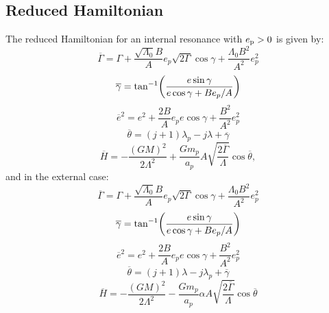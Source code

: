 \documentclass{article}
\newcommand{\extra}[1]{{}}
\newcommand{\edisk}{e_{\rm disk}}
\newcommand{\ep}{e_{\rm p}}
\DeclarePairedDelimiter{\abs}{|}{|}
\DeclarePairedDelimiter{\p}{(}{)}
\begin{document}
\subsection{Reduced Hamiltonian}\label{app:reducedH}
The reduced Hamiltonian for an internal resonance with $\ep>0$ is given by:
  \[ \overline{\Gamma} = \Gamma + \frac{\sqrt{\Lambda_0}B}{A} e_p\sqrt{2\Gamma}\cos\gamma + \frac{\Lambda_0B^2}{A^2}e_p^2 \]
\[ \overline{\gamma} = \tan^{-1}\p*{\frac{e\sin\gamma}{e\cos\gamma + Be_p/A}} \]
\[ \overline{e}^2 = e^2 + \frac{2B}{A} e_p e \cos\gamma + \frac{B^2}{A^2}e_p^2\]
  \[\overline{\theta} = (j+1)\lambda_p - j\lambda + \overline{\gamma} \]
\[ \overline{H} = - \frac{(GM)^2}{2\Lambda^2} + \frac{Gm_p}{a_p}A\sqrt{\frac{2\overline{\Gamma}}{\Lambda}}\cos\overline{\theta}, \]
and in the external case:
  \[ \overline{\Gamma} = \Gamma + \frac{\sqrt{\Lambda_0}B}{A} e_p\sqrt{2\Gamma}\cos\gamma + \frac{\Lambda_0B^2}{A^2}e_p^2 \]
\[ \overline{\gamma} = \tan^{-1}\p*{\frac{e\sin\gamma}{e\cos\gamma + Be_p/A}} \]
\[ \overline{e}^2 = e^2 + \frac{2B}{A} e_p e \cos\gamma + \frac{B^2}{A^2}e_p^2\]
  \[\overline{\theta} = (j+1)\lambda - j\lambda_p + \overline{\gamma} \]
\[ \overline{H} = - \frac{(GM)^2}{2\Lambda^2} - \frac{Gm_p}{a_p}\alpha A\sqrt{\frac{2\overline{\Gamma}}{\Lambda}}\cos\overline{\theta} \]
\extra{
For the $\edisk\lesssim \ep$ regime in the $(\ep,\edisk)$ parameter space,
$\dot{\gamma}\to 0$ and $\abs{\gamma-\gamma_p}\to 0$, resulting in
apsidal alignment. In the opposite regime, $\dot{\gamma}\neq 0$ and
$\abs{\gamma - \gamma_p}$ circulates.
For $\edisk \sim \ep$, the dynamics are complicated, and we turn to numerical
simulations.

  \begin{equation}
  \label{eq:gammadot}
\dot{\gamma} = \mu_p\left(\pm\frac{A\cos\theta}{\sqrt{2\Gamma\Lambda}}
    - \frac{2C}{\Lambda} -
    D\ep\frac{\cos\gamma}{\sqrt{2\Gamma\Lambda}}\right).
\end{equation}
Since $\theta$ circulates, the first term typically averages out to zero,
and the $(\pm)$ does not matter. If $\dot{\gamma}\approx 0$,
then
\[ \ep \approx 2\abs*{\frac{C}{D}}\edisk\approx \edisk \]
for both the internal and external resonances.
Hence, if $\ep\lesssim \edisk$, the middle term in equation (\ref{eq:gammadot})
dominates and $\dot\gamma$ may go to 0, leading to apsidal alignment.
If $\ep\gtrsim \edisk$, the last term in equation (\ref{eq:gammadot})
dominates, and $\dot\gamma \neq 0$ destroying any apsidal alignment.}
\end{document}
